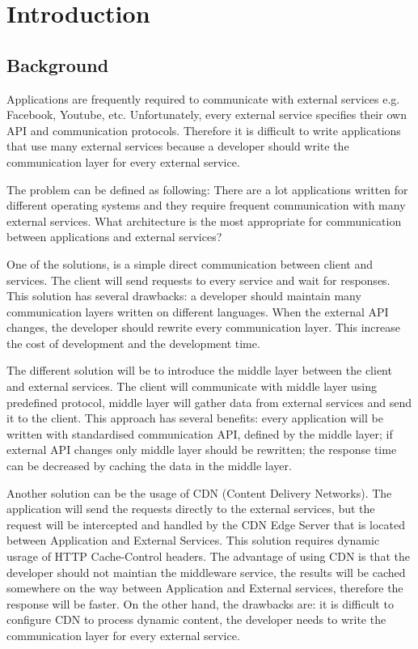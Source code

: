 \section*{Introduction}

\subsection{Background}

Applications are frequently required to communicate with external services e.g. Facebook, Youtube, etc. Unfortunately, every external service specifies their own API and communication protocols. Therefore it is difficult to write applications that use many external services because a developer should write the communication layer for every external service. 

The problem can be defined as following:  There are a lot applications written for different operating systems and they require frequent communication with many external services. What architecture is the most appropriate for communication between applications and external services? 

One of the solutions, is a simple direct communication between client and services. The client will send requests to every service and wait for responses. This solution has several drawbacks: a developer should maintain many communication layers written on different languages. When the external API changes, the developer should rewrite every communication layer. This increase the cost of development and the development time. 

The different solution will be to introduce the middle layer between the client and external services. The client will communicate with middle layer using predefined protocol, middle layer will gather data from external services and send it to the client. This approach has several benefits: every application will be written with standardised communication API, defined by the middle layer; if external API changes only middle layer should be rewritten; the response time can be decreased by caching the data in the middle layer. 

Another solution can be the usage of CDN (Content Delivery Networks). The application will send the requests directly to the external services, but the request will be intercepted and handled by the CDN Edge Server that is located between Application and External Services. This solution requires dynamic usrage of HTTP Cache-Control headers. The advantage of using CDN is that the developer should not maintian the middleware service, the results will be cached somewhere on the way between Application and External services, therefore the response will be faster. On the other hand, the drawbacks are: it is difficult to configure CDN to process dynamic content, the developer needs to write the communication layer for every external service. 

